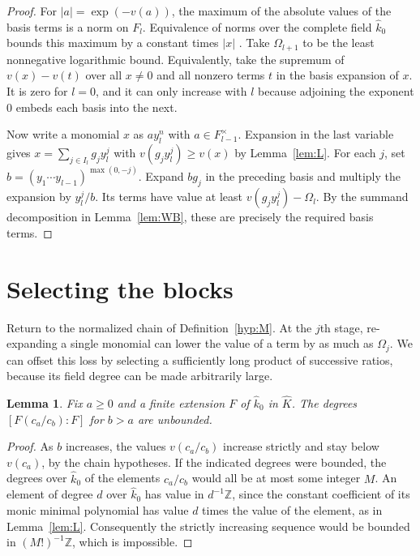 \documentclass[11pt, letterpaper]{article}
\newtheorem{lemma}[theorem]{Lemma}
\theoremstyle{definition}
\theoremstyle{remark}
\begin{document}
\begin{proof}
    For $|a| = \exp(-v(a))$, the maximum of the absolute values of the basis terms is a norm on $F_{l}$.
    Equivalence of norms over the complete field $\widehat{k}_{0}$ bounds this maximum by a constant times $|x|$ \cite[Proposition~1.2.2]{MR2183496}.
    Take $\Omega_{l + 1}$ to be the least nonnegative logarithmic bound.
    Equivalently, take the supremum of $v(x) - v(t)$ over all $x \ne 0$ and all nonzero terms $t$ in the basis expansion of $x$.
    It is zero for $l = 0$, and it can only increase with $l$ because adjoining the exponent $0$ embeds each basis into the next.

    Now write a monomial $x$ as $a y_{l}^{n}$ with $a \in F_{l - 1}^{\times}$.
    Expansion in the last variable gives $x = \sum_{j \in I_{l}} g_{j} y_{l}^{j}$ with $v(g_{j} y_{l}^{j}) \ge v(x)$ by Lemma~\ref{lem:L}.
    For each $j$, set $b = (y_{1} \cdots y_{l - 1})^{\max(0, -j)}$.
    Expand $b g_{j}$ in the preceding basis and multiply the expansion by $y_{l}^{j}/b$.
    Its terms have value at least $v(g_{j} y_{l}^{j}) - \Omega_{l}$.
    By the summand decomposition in Lemma~\ref{lem:WB}, these are precisely the required basis terms.
\end{proof}

\section{Selecting the blocks}
\label{sec:blocks}

Return to the normalized chain of Definition~\ref{hyp:M}.
At the $j$th stage, re-expanding a single monomial can lower the value of a term by as much as $\Omega_{j}$.
We can offset this loss by selecting a sufficiently long product of successive ratios, because its field degree can be made arbitrarily large.

\begin{lemma}
    \label{lem:degreegrowth}
    Fix $a \ge 0$ and a finite extension $F$ of $\widehat{k}_{0}$ in $\widehat{K}$.
    The degrees $[F(c_{a}/c_{b}) : F]$ for $b > a$ are unbounded.
\end{lemma}

\begin{proof}
    As $b$ increases, the values $v(c_{a}/c_{b})$ increase strictly and stay below $v(c_{a})$, by the chain hypotheses.
    If the indicated degrees were bounded, the degrees over $\widehat{k}_{0}$ of the elements $c_{a}/c_{b}$ would all be at most some integer $M$.
    An element of degree $d$ over $\widehat{k}_{0}$ has value in $d^{-1}\mathbb{Z}$, since the constant coefficient of its monic minimal polynomial has value $d$ times the value of the element, as in Lemma~\ref{lem:L}.
    Consequently the strictly increasing sequence would be bounded in $(M!)^{-1}\mathbb{Z}$, which is impossible.
\end{proof}
\end{document}
